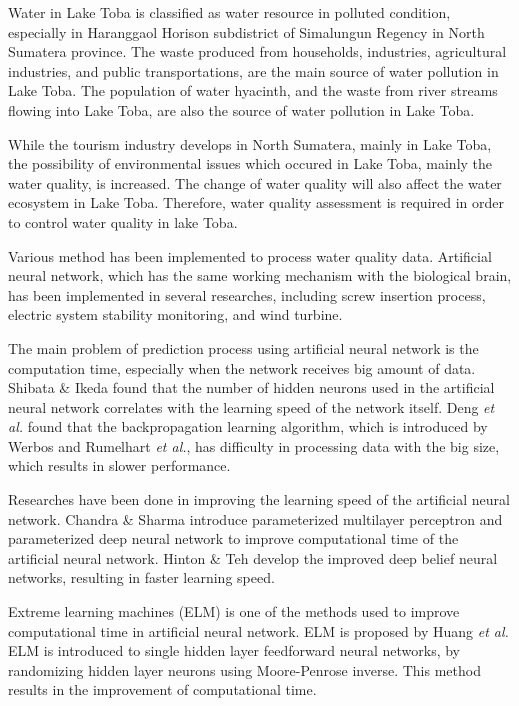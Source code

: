 \documentclass{ws-ijait}
\begin{document}
Water in Lake Toba is classified as water resource in polluted condition, especially in Haranggaol Horison subdistrict of Simalungun Regency in North Sumatera province\cite{1}. The waste produced from households, industries, agricultural industries, and public transportations, are the main source of water pollution in Lake Toba. The population of water hyacinth, and the waste from river streams flowing into Lake Toba, are also the source of water pollution in Lake Toba.

While the tourism industry develops in North Sumatera, mainly in Lake Toba, the possibility of environmental issues which occured in Lake Toba, mainly the water quality, is increased. The change of water quality will also affect the water ecosystem in Lake Toba. Therefore, water quality assessment is required in order to control water quality in lake Toba.

Various method has been implemented to process water quality data. Artificial neural network, which has the same working mechanism with the biological brain, has been implemented in several researches, including screw insertion process\cite{2}, electric system stability monitoring\cite{3}, and wind turbine\cite{4}.

The main problem of prediction process using artificial neural network is the computation time, especially when the network receives big amount of data. Shibata \& Ikeda\cite{5} found that the number of hidden neurons used in the artificial neural network correlates with the learning speed of the network itself. Deng \textit{et al.}\cite{6} found that the backpropagation learning algorithm, which is introduced by Werbos\cite{7} and Rumelhart \textit{et al.}\cite{8}, has difficulty in processing data with the big size, which results in slower performance.

Researches have been done in improving the learning speed of the artificial neural network. Chandra \& Sharma introduce parameterized multilayer perceptron\cite{9} and parameterized deep neural network \cite{10} to improve computational time of the artificial neural network. Hinton \& Teh\cite{11} develop the improved deep belief neural networks, resulting in faster learning speed.

Extreme learning machines (ELM) is one of the methods used to improve computational time in artificial neural network. ELM is proposed by Huang \textit{et al.}\cite{12} ELM is introduced to single hidden layer feedforward neural networks, by randomizing hidden layer neurons using Moore-Penrose inverse. This method results in the improvement of computational time.
\end{document}
